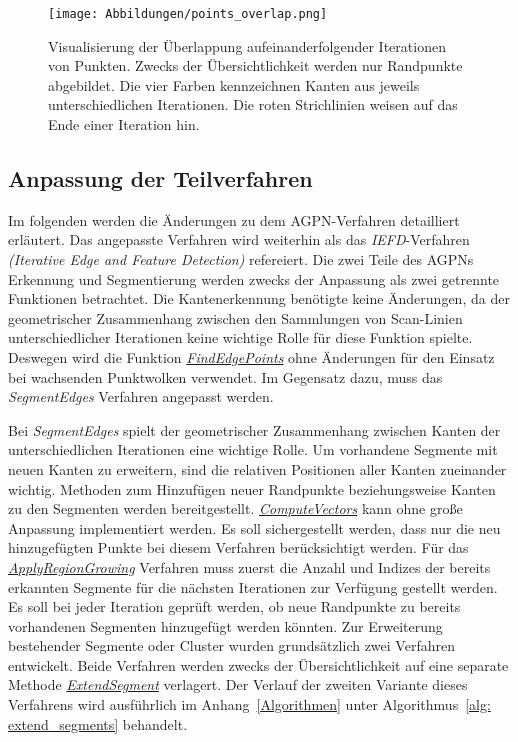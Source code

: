\begin{figure}[h]
	\texttt{[image: Abbildungen/points\_overlap.png]}
	\centering
	\caption[Überlappungen der Punkte zwischen zwei Regionen]{Visualisierung der Überlappung aufeinanderfolgender Iterationen von Punkten. Zwecks der Übersichtlichkeit werden nur Randpunkte abgebildet. Die vier Farben kennzeichnen Kanten aus jeweils unterschiedlichen Iterationen. Die roten Strichlinien weisen auf das Ende einer Iteration hin.}
	\label{fig: point_overlap}
\end{figure}

\subsection{Anpassung der Teilverfahren}
Im folgenden werden die Änderungen zu dem AGPN-Verfahren detailliert erläutert. Das angepasste Verfahren wird weiterhin als das \textit{IEFD}-Verfahren \textit{(Iterative Edge and Feature Detection)} refereiert. Die zwei Teile des AGPNs \textendash{} Erkennung und Segmentierung \textendash{} werden zwecks der Anpassung als zwei getrennte Funktionen betrachtet. Die Kantenerkennung benötigte keine Änderungen, da der geometrischer Zusammenhang zwischen den Sammlungen von Scan-Linien unterschiedlicher Iterationen keine wichtige Rolle für diese Funktion spielte. Deswegen wird die Funktion \textit{\hyperref[alg:find_edge_points]{FindEdgePoints}} ohne Änderungen für den Einsatz bei wachsenden Punktwolken verwendet. Im Gegensatz dazu, muss das \textit{SegmentEdges} Verfahren angepasst werden.

Bei \textit{SegmentEdges} spielt der geometrischer Zusammenhang zwischen Kanten der unterschiedlichen Iterationen eine wichtige Rolle. Um vorhandene Segmente mit neuen Kanten zu erweitern, sind die relativen Positionen aller Kanten zueinander wichtig. Methoden zum Hinzufügen neuer Randpunkte beziehungsweise Kanten zu den Segmenten werden bereitgestellt. \textit{\hyperref[alg:compute_vectors]{ComputeVectors}} kann ohne große Anpassung implementiert werden. Es soll sichergestellt werden, dass nur die neu hinzugefügten Punkte bei diesem Verfahren berücksichtigt werden. Für das \textit{\hyperref[alg:apply_region_growing]{ApplyRegionGrowing}} Verfahren muss zuerst die Anzahl und Indizes der bereits erkannten Segmente für die nächsten Iterationen zur Verfügung gestellt werden. Es soll bei jeder Iteration geprüft werden, ob neue Randpunkte zu bereits vorhandenen Segmenten hinzugefügt werden könnten. Zur Erweiterung bestehender Segmente oder Cluster wurden grundsätzlich zwei Verfahren entwickelt. Beide Verfahren werden zwecks der Übersichtlichkeit auf eine separate Methode \textit{\hyperref[alg: extend_segments]{ExtendSegment}} verlagert. Der Verlauf der zweiten Variante dieses Verfahrens wird ausführlich im Anhang~\ref{Algorithmen} unter Algorithmus~\ref{alg: extend_segments} behandelt.

